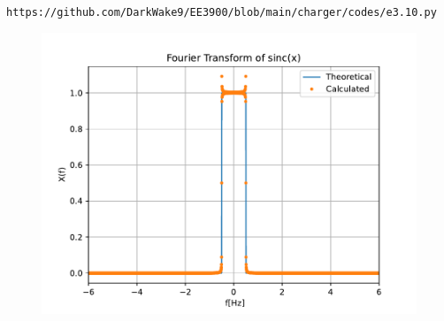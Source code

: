\documentclass[journal,12pt,twocolumn]{IEEEtran}
\renewcommand\thesection{\arabic{section}}
\begin{document}
\begin{enumerate}[label=\thesection.\arabic*
,ref=\thesection.\theenumi]
\begin{align}
\end{align}
\begin{lstlisting}
https://github.com/DarkWake9/EE3900/blob/main/charger/codes/e3.10.py
\end{lstlisting}
\begin{figure}[!ht]
	\begin{center}
		\includegraphics[width=\columnwidth]{./figs/e3.10.pdf}
	\end{center}
	\label{fig:}	
\end{figure}
\end{enumerate}
\end{document}
